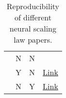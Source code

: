\begin{table*}[htbp]
{\begin{tabular}{lccc}
        \citet{allen-zhu_physics_2024} & N & N & ~ \\ 
        \citet{ma_neural_2024} & Y & N & \href{https://github.com/HaitaoMao/Graph-Neural-Scaling-Law}{Link}  \\ 
        \citet{sorscher_beyond_2023} & N & Y & \href{https://github.com/rgeirhos/dataset-pruning-metrics}{Link}  \\
        \cline{1-4}
    \end{tabular}
    }
    \caption{Reproducibility of different neural scaling law papers.}
    \label{tab:reproducibility}
\end{table*}